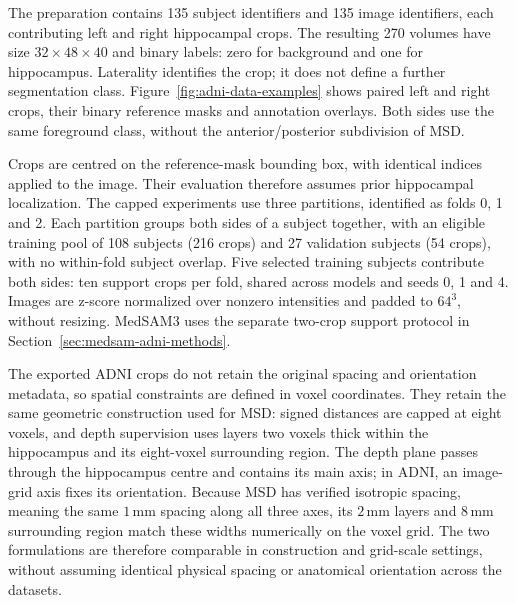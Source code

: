 \documentclass[12pt,a4paper]{article}
\begin{document}
The preparation contains 135 subject identifiers and 135 image
identifiers, each contributing left and right hippocampal crops.
The resulting 270 volumes have size $32\times48\times40$ and binary
labels: zero for background and one for hippocampus. Laterality
identifies the crop; it does not define a further segmentation class.
Figure~\ref{fig:adni-data-examples} shows paired left and right crops,
their binary reference masks and annotation overlays. Both sides use
the same foreground class, without the anterior/posterior subdivision
of MSD.


Crops are centred on the reference-mask bounding box, with identical
indices applied to the image. Their evaluation therefore assumes prior
hippocampal localization. The capped experiments use three partitions,
identified as folds 0, 1 and 2. Each partition groups both sides of a
subject together, with an eligible training pool of 108 subjects
(216 crops) and 27 validation subjects (54 crops), with no within-fold
subject overlap. Five selected training subjects contribute both sides:
ten support crops per fold, shared across models and seeds 0, 1 and 4.
Images are
z-score normalized over nonzero intensities and padded to $64^3$,
without resizing. MedSAM3 uses the separate
two-crop support protocol in Section~\ref{sec:medsam-adni-methods}.

The exported ADNI crops do not retain the original spacing and orientation
metadata, so spatial constraints are defined in voxel coordinates. They
retain the same geometric construction used for MSD: signed distances are
capped at eight voxels, and depth supervision uses layers two voxels thick
within the hippocampus and its eight-voxel surrounding region. The depth
plane passes through the hippocampus centre and contains its main axis; in
ADNI, an image-grid axis fixes its orientation. Because MSD has verified
isotropic spacing, meaning the same $1\,\mathrm{mm}$ spacing along all three
axes, its $2\,\mathrm{mm}$ layers and $8\,\mathrm{mm}$ surrounding region
match these widths numerically on the voxel grid. The two formulations are
therefore comparable in construction and grid-scale settings, without
assuming identical physical spacing or anatomical orientation across the
datasets.
\end{document}
